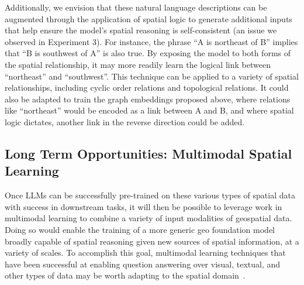 Additionally, we envision that these natural language descriptions can be augmented through the application of spatial logic to generate additional inputs that help ensure the model's spatial reasoning is self-consistent (an issue we observed in Experiment 3).
For instance, the phrase ``A is northeast of B'' implies that ``B is southwest of A'' is also true.
By exposing the model to both forms of the spatial relationship, it may more readily learn the logical link between ``northeast'' and ``southwest''.
This technique can be applied to a variety of spatial relationships, including cyclic order relations and topological relations.
It could also be adapted to train the graph embeddings proposed above, where relations like ``northeast'' would be encoded as a link between A and B, and where spatial logic dictates, another link in the reverse direction could be added.





\subsection{Long Term Opportunities: Multimodal Spatial Learning}
Once LLMs can be successfully pre-trained on these various types of spatial data with success in downstream tasks, it will then be possible to leverage work in multimodal learning to combine a variety of input modalities of geospatial data.
Doing so would enable the training of a more generic geo foundation model broadly capable of spatial reasoning given new sources of spatial information, at a variety of scales.
To accomplish this goal, multimodal learning techniques that have been successful at enabling question answering over visual, textual, and other types of data may be worth adapting to the spatial domain~\cite{Fei2022}.